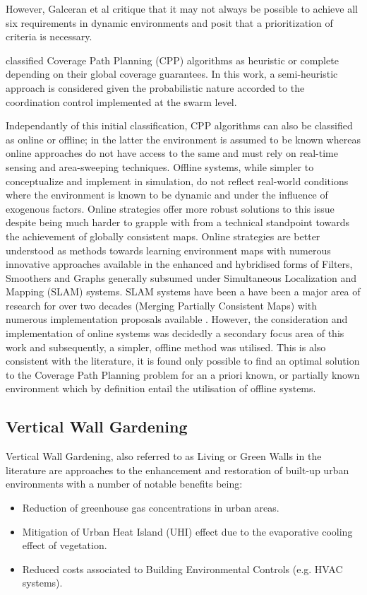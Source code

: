 \documentclass{report}
\begin{document}
However, Galceran et al \cite{Galceran2013} critique that it may not always be possible to achieve all six requirements in dynamic environments and posit that a prioritization of criteria is necessary.

\cite{Choset2001} classified Coverage Path Planning (CPP) algorithms as heuristic or complete depending on their global coverage guarantees. In this work, a semi-heuristic approach is considered given the probabilistic nature accorded to the coordination control implemented at the swarm level.

Independantly of this initial classification, CPP algorithms can also be classified as online or offline; in the latter the environment is assumed to be known whereas online approaches do not have access to the same and must rely on real-time sensing and area-sweeping techniques. Offline systems, while simpler to conceptualize and implement in simulation, do not reflect real-world conditions where the environment is known to be dynamic and under the influence of exogenous factors. Online strategies offer more robust solutions to this issue despite being much harder to grapple with from a technical standpoint towards the achievement of globally consistent maps. Online strategies are better understood as methods towards learning environment maps with numerous innovative approaches available in the enhanced and hybridised forms of Filters, Smoothers and Graphs generally subsumed under Simultaneous Localization and Mapping (SLAM) systems. SLAM systems have been a have been a major area of research for over two decades (Merging Partially Consistent Maps) with numerous implementation proposals available \cite{Lu1997} \cite{Grisetti2007} \cite{Montemerlo2002} \cite{Olson2006} \cite{Smith1987} \cite{Thrun2004}. However, the consideration and implementation of online systems was decidedly a secondary focus area of this work and subsequently, a simpler, offline method was utilised. This is also consistent with the literature, it is found only possible to find an optimal solution to the Coverage Path Planning problem for an a priori known, or partially known environment \cite{Galceran2013} which by definition entail the utilisation of offline systems.

\subsection{Vertical Wall Gardening}
Vertical Wall Gardening, also referred to as Living \cite{Sheweka2011} or Green \cite{Manso2015} Walls in the literature are approaches to the enhancement and restoration of built-up urban environments with a number of notable benefits being:
\begin{itemize}
	\item Reduction of greenhouse gas concentrations in urban areas.
	\item Mitigation of Urban Heat Island (UHI) effect due to the evaporative cooling effect of vegetation.
	\item Reduced costs associated to Building Environmental Controls (e.g. HVAC systems).
\end{itemize}
\end{document}
